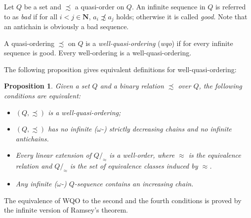 \documentclass[12pt]{article}
\newtheorem{prop}{Proposition}
\newcommand{\NN}{{\mathbf N}}
\begin{document}
Let $Q$ be a set and $\precsim$ a quasi-order on $Q$.  An
infinite sequence in $Q$ is referred to as \emph{bad} if for
all $i<j \in \NN$, $a_i \not\precsim a_j$ holds; otherwise it is called
\emph{good}. Note that an antichain is obviously a bad sequence. 

A quasi-ordering $\precsim$ on $Q$ is a \emph{well-quasi-ordering} (\emph{wqo}) if for every infinite sequence is good.  Every well-ordering is a well-quasi-ordering.

The following proposition gives equivalent definitions for
well-quasi-ordering:
\begin{prop}
Given a set $Q$ and a binary relation $\precsim$ over $Q$, the
following conditions are equivalent:
\begin{itemize}
  \item $(Q, \precsim)$ is a well-quasi-ordering;
  \item $(Q, \precsim)$ has no infinite ($\omega$-) strictly decreasing chains
and no infinite antichains.
  \item Every linear extension of $Q/_\approx$ is a well-order, where $\approx$ is the equivalence relation and $Q/_\approx$ is the set of equivalence classes induced by $\approx$.
  \item Any infinite ($\omega$-) $Q$-sequence contains an
increasing chain.
\end{itemize}
\end{prop}

The equivalence of WQO to the second and the fourth conditions is proved by the infinite version of Ramsey's theorem.
\end{document}
